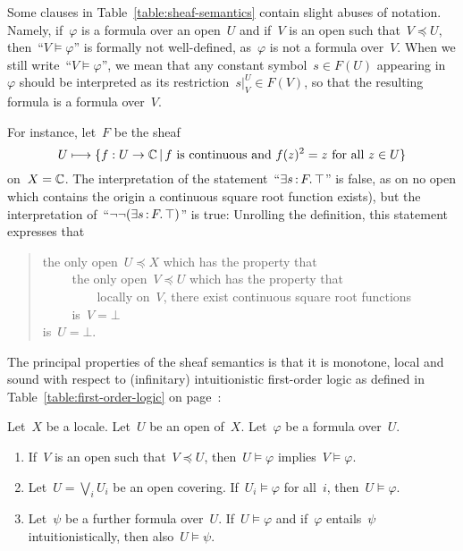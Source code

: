 \documentclass{ws-rv9x6}
\begin{document}
{Some clauses in Table~\ref{table:sheaf-semantics} contain slight abuses of
notation. Namely, if~$\varphi$ is a formula over an open~$U$ and if~$V$ is an
open such that~$V \preceq U$, then~``$V \models \varphi$'' is formally not
well-defined, as~$\varphi$ is not a formula over~$V$. When we still write~``$V
\models \varphi$'', we mean that any constant symbol~$s \in F(U)$ appearing
in~$\varphi$ should be interpreted as its restriction~$s|^U_V \in F(V)$, so
that the resulting formula is a formula over~$V$.

\begin{example}\label{ex:negneg}
For instance, let~$F$ be the sheaf
\[ U \longmapsto \{ f : U \to \mathbb{C} \,|\, \text{$f$ is continuous and~$f(z)^2 =
z$ for all~$z \in U$} \} \]
on~$X = \mathbb{C}$. The interpretation of the statement~``$\exists s\,{:}\,F\mathpunct{.} \top$'' is
false, as on no open which contains the origin a continuous square root
function exists), but the interpretation of~``$\neg\neg(\exists s\,{:}\,F\mathpunct{.} \top)$''
is true: Unrolling the definition, this statement expresses that\par
\begin{quote}
the only open~$U \preceq X$ which has the property that \\
${\qquad}$ the only open~$V \preceq U$ which has the property that \\
${\qquad\qquad}$ locally on~$V$, there exist continuous square root functions \\
${\qquad}$ is~$V = \bot$ \\
is~$U = \bot$.
\end{quote}
\end{example}


The principal properties of the sheaf semantics is that it is monotone, local
and sound with respect to (infinitary) intuitionistic first-order logic as
defined in Table~\ref{table:first-order-logic} on
page~\pageref{table:first-order-logic}:

\begin{theorem}\label{thm:basic-properties-sheaf-semantics}
Let~$X$ be a locale. Let~$U$ be an open of~$X$. Let~$\varphi$ be
a formula over~$U$.
\begin{enumerate}
\item If~$V$ is an open such that~$V \preceq U$, then~$U \models
\varphi$ implies~$V \models \varphi$.
\item Let~$U = \bigvee_i U_i$ be an open covering. If~$U_i \models
\varphi$ for all~$i$, then~$U \models \varphi$.
\item Let~$\psi$ be a further formula over~$U$. If~$U \models
\varphi$ and if~$\varphi$ entails~$\psi$ intuitionistically, then also~$U
\models \psi$.
\end{enumerate}
\end{theorem}

}
\end{document}
